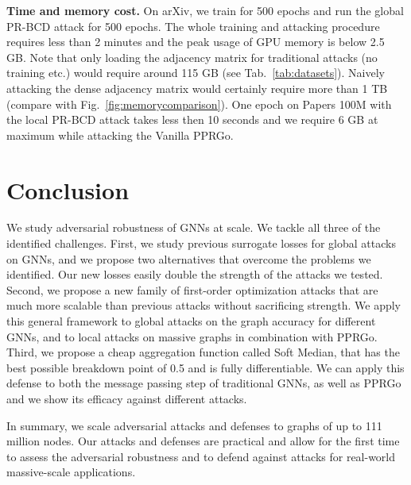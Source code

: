 \documentclass[sigconf, review]{acmart}
\begin{document}
\textbf{Time and memory cost.} On arXiv, we train for 500 epochs and run the global PR-BCD attack for 500 epochs. The whole training and attacking procedure requires less than 2 minutes and the peak usage of GPU memory is below 2.5 GB.
Note that only loading the adjacency matrix for traditional attacks (no training etc.) would require around 115 GB (see Tab.~\ref{tab:datasets}). Naively attacking the dense adjacency matrix would certainly require more than 1 TB (compare with Fig.~\ref{fig:memorycomparison}). One epoch on Papers 100M with the local PR-BCD attack takes less then 10 seconds and we require 6 GB at maximum while attacking the Vanilla PPRGo.

\section{Conclusion}\label{sec:conclusion} %

We study adversarial robustness of GNNs at scale. We tackle all three of the identified challenges. First, we study previous surrogate losses for global attacks on GNNs, and we propose two alternatives that overcome the problems we identified. Our new losses easily double the strength of the attacks we tested. Second, we propose a new family of first-order optimization attacks that are much more scalable than previous attacks without sacrificing strength. We apply this general framework to global attacks on the graph accuracy for different GNNs, and to local attacks on massive graphs in combination with PPRGo. Third, we propose a cheap aggregation function called Soft Median, that has the best possible breakdown point of 0.5 and is fully differentiable. We can apply this defense to both the message passing step of traditional GNNs, as well as PPRGo and we show its efficacy against different attacks.

In summary, we scale adversarial attacks and defenses to graphs of up to 111 million nodes. Our attacks and defenses are practical 
and allow for the first time to assess the adversarial robustness and to defend against attacks for  real-world massive-scale applications.


\end{document}

